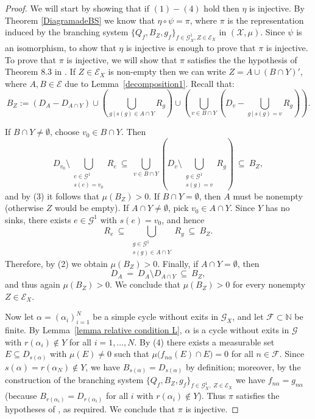\documentclass[12pt, reqno]{amsart}
\theoremstyle{definition}
\theoremstyle{remark}
\numberwithin{equation}{section}
\newcommand{\G}{\mathcal{G}}
\begin{document}
\begin{proof}

We will start by showing that if $(1)-(4)$ hold then $\eta$ is injective. By Theorem \ref{DiagramadeBS} we know that $\eta \circ \psi = \pi$, where $\pi$ is the representation induced by the branching system $\{Q_f, B_Z, g_f\}_{f \in \G_X^1, Z \in \mathcal{E}_X}$ in $(\mathcal{X},\mu)$. Since $\psi$ is an isomorphism, to show that $\eta$ is injective is enough to prove that $\pi$ is injective. To prove that $\pi$ is injective, we will show that $\pi$ satisfies the the hypothesis of Theorem $8.3$ in \cite{DDH}.
If $Z \in \mathcal{E}_X$ is non-empty then we can write $Z = A \cup (B \cap Y)'$, where $A,B \in \mathcal{E}$ due to Lemma~\ref{decomposition1}. Recall that:
$$B_{Z} := ( D_{A} - D_{A \cap Y} )\cup \left( \bigcup\limits_{g \ | \ s(g) \in A \cap Y } R_g \right)  \cup  \left( \bigcup\limits_{v \in B \cap Y} \left( D_v -    \bigcup\limits_{g \ | \ s(g) = v} R_g  \right) \right).$$

If $B \cap Y \neq \emptyset$, choose $v_0 \in B \cap Y$. Then
\[
D_{v_0} \setminus \bigcup_{\substack{e \in \mathcal{G}^1 \\ s(e)=v_0}} R_e
\ \subseteq\
\bigcup_{v \in B \cap Y} \left( D_v \setminus \bigcup_{\substack{g \in \mathcal{G}^1 \\ s(g)=v}} R_g \right)
\ \subseteq\ B_Z,
\]
and by (3) it follows that $\mu(B_Z) > 0$. If $B \cap Y = \emptyset$, then $A$ must be nonempty (otherwise
$Z$ would be empty). If $A \cap Y \neq \emptyset$, pick $v_0 \in A \cap Y$. Since $Y$ has no sinks, there exists $e \in \mathcal{G}^1$ with $s(e)=v_0$, and hence
\[
R_e \ \subseteq\ \bigcup_{\substack{g \in \mathcal{G}^1 \\ s(g)\in A \cap Y}} R_g \ \subseteq\ B_Z.
\]
Therefore, by (2) we obtain $\mu(B_Z) > 0$. Finally, if $A \cap Y = \emptyset$, then
\[
D_A \ =\ D_A \setminus D_{A \cap Y} \ \subseteq\ B_Z,
\]
and thus again $\mu(B_Z) > 0$. We conclude that $\mu(B_Z) > 0$ for every nonempty $Z \in \mathcal{E}_X$.

Now let $\alpha=(\alpha_i)_{i=1}^N$ be a simple cycle without exits in $\mathcal{G}_X$, and let
$\mathcal{F} \subset \mathbb{N}$ be finite. By Lemma~\ref{lemma relative condition L}, $\alpha$ is a cycle without exits in $\mathcal{G}$ with $r(\alpha_i) \notin Y$ for all $i=1,\dots,N$. By (4) there exists a measurable set $E \subseteq D_{s(\alpha)}$ with $\mu(E) \neq 0$ such that
$\mu\bigl(f_{n\alpha}(E) \cap E\bigr)=0$ for all $n \in \mathcal{F}$. Since
$s(\alpha)=r(\alpha_N)\notin Y$, we have $B_{s(\alpha)}=D_{s(\alpha)}$ by definition; moreover, by the construction of the branching system $\{Q_f,B_Z,g_f\}_{f \in \mathcal{G}_X^1,\; Z \in \mathcal{E}_X}$ we have $f_{n\alpha}=g_{n\alpha}$ (because $B_{r(\alpha_i)}=D_{r(\alpha_i)}$ for all $i$ with $r(\alpha_i)\notin Y$). Thus $\pi$ satisfies the hypotheses of \cite[Theorem~8.3]{DDH}, as required. We conclude that $\pi$ is injective.



\end{proof}
\end{document}
